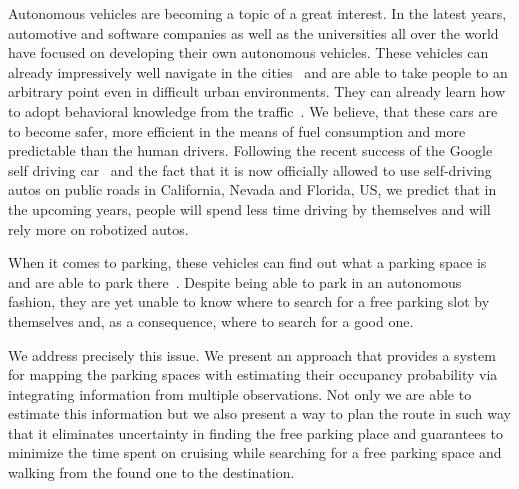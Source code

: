 Autonomous vehicles are becoming a topic of a great interest. In the latest
years, automotive and software companies as well as the universities all over
the world have focused on developing their own autonomous vehicles. These
vehicles can already impressively well navigate in the
cities~\cite{stanley_auto_car,perceprion_drivec_car,lima13} and are able to
take people to an arbitrary point even in difficult urban environments. They
can already learn how to adopt behavioral knowledge from the
traffic~\cite{behaviour_learning,spinello10:multiclass}. We believe, that
these cars are to become safer, more efficient in the means of fuel
consumption and more predictable than the human drivers. Following the recent
success of the Google self driving car~\cite{markoff2010google} and the fact
that it is now officially allowed to use self-driving autos on public roads in
California, Nevada and Florida, US, we predict that in the upcoming years,
people will spend less time driving by themselves and will rely more on
robotized autos.

When it comes to parking, these vehicles can find out what a parking space is
and are able to park
there~\cite{auto_cars_burgard,auto_parking09,auto_park2_11}. Despite being
able to park in an autonomous fashion, they are yet unable to know where to
search for a free parking slot by themselves and, as a consequence, where to
search for a good one.

We address precisely this issue. We present an approach that provides a system
for mapping the parking spaces with estimating their occupancy probability via
integrating information from multiple observations. Not only we are able to
estimate this information but we also present a way to plan the route in such
way that it eliminates uncertainty in finding the free parking place and
guarantees to minimize the time spent on cruising while searching for a free
parking space and walking from the found one to the destination.

